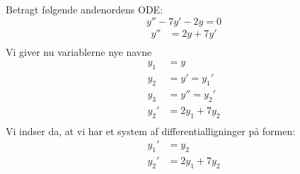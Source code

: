 \begin{Example}
\textnormal{Betragt følgende andenordens ODE:}
$$y'' - 7y' - 2y = 0 $$
\begin{align*}
    y'' &= 2y + 7y'\\
\end{align*}
\textnormal{Vi giver nu variablerne nye navne}
\begin{align*}
    y_1 &= y\\
    y_2 &= y' = y_1'\\
    y_3 &= y'' = y_2'\\
    y_2' &= 2y_1 + 7y_2\\
\end{align*}
\textnormal{Vi indser da, at vi har et system af differentialligninger på formen:}
\begin{align*}
    y_1' &= y_2\\
    y_2' &= 2y_1 + 7y_2
\end{align*}
\end{Example}